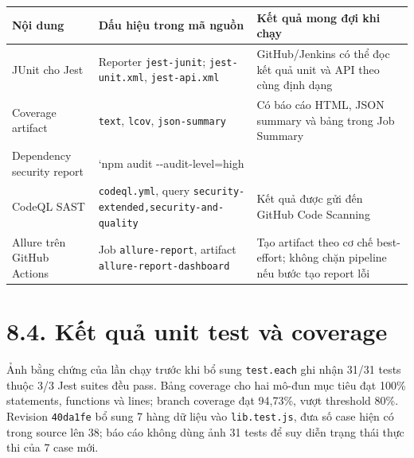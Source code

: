 \documentclass[
  vietnamese,
  12pt,
  a4paper,
  oneside]{report}
\begin{document}
\begin{longtable}[]{@{}
  >{\raggedright\arraybackslash}p{}
  >{\raggedright\arraybackslash}p{}
  >{\raggedright\arraybackslash}p{}@{}}
\toprule\noalign{}
\begin{minipage}[b]{\linewidth}\raggedright
Nội dung
\end{minipage} & \begin{minipage}[b]{\linewidth}\raggedright
Dấu hiệu trong mã nguồn
\end{minipage} & \begin{minipage}[b]{\linewidth}\raggedright
Kết quả mong đợi khi chạy
\end{minipage} \\
\midrule\noalign{}
\endhead
\bottomrule\noalign{}
\endlastfoot
JUnit cho Jest & Reporter \texttt{jest-junit}; \texttt{jest-unit.xml},
\texttt{jest-api.xml} & GitHub/Jenkins có thể đọc kết quả unit và API
theo cùng định dạng \\
Coverage artifact & \texttt{text}, \texttt{lcov}, \texttt{json-summary}
& Có báo cáo HTML, JSON summary và bảng trong Job Summary \\
Dependency security report & `npm audit -\/-audit-level=high & \\
CodeQL SAST & \texttt{codeql.yml}, query
\nolinkurl{security-extended,security-and-quality} & Kết quả được gửi
đến GitHub Code Scanning \\
Allure trên GitHub Actions & Job \texttt{allure-report}, artifact
\texttt{allure-report-dashboard} & Tạo artifact theo cơ chế best-effort;
không chặn pipeline nếu bước tạo report lỗi \\
\end{longtable}

\section{8.4. Kết quả unit test và
coverage}\label{84-kux1ebft-quux1ea3-unit-test-vuxe0-coverage}

Ảnh bằng chứng của lần chạy trước khi bổ sung \texttt{test.each} ghi
nhận 31/31 tests thuộc 3/3 Jest suites đều pass. Bảng coverage cho hai
mô-đun mục tiêu đạt 100\% statements, functions và lines; branch
coverage đạt 94,73\%, vượt threshold 80\%. Revision \texttt{40da1fe} bổ
sung 7 hàng dữ liệu vào \texttt{lib.test.js}, đưa số case hiện có trong
source lên 38; báo cáo không dùng ảnh 31 tests để suy diễn trạng thái
thực thi của 7 case mới.
\end{document}
